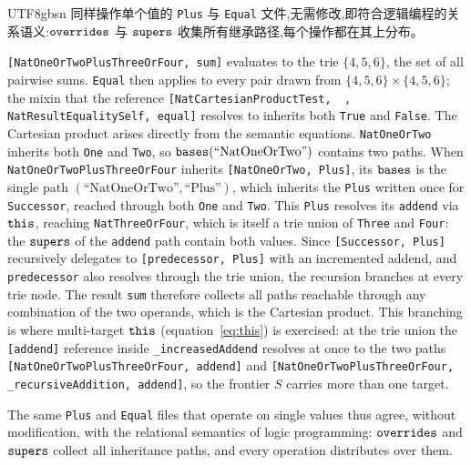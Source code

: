 \begin{CJK*}{UTF8}{gbsn}
同样操作单个值的 \texttt{Plus} 与 \texttt{Equal} 文件,无需修改,即符合逻辑编程的关系语义:$\mathtt{overrides}$ 与 $\mathtt{supers}$ 收集所有继承路径,每个操作都在其上分布。
\else
\begin{sloppypar}
\texttt{[NatOneOrTwoPlusThreeOrFour, sum]} evaluates to the trie $\{4,5,6\}$, the set of all pairwise sums.
\texttt{Equal} then applies to every pair drawn from $\{4,5,6\} \times \{4,5,6\}$;
the mixin that the reference \texttt{[NatCartesianProductTest, ~, NatResultEqualitySelf, equal]} resolves to
inherits both \texttt{True} and \texttt{False}.
The Cartesian product arises directly from the semantic equations.
\texttt{NatOneOrTwo} inherits both \texttt{One} and \texttt{Two},
so $\mathtt{bases}(\text{``NatOneOrTwo''})$ contains two paths.
When \texttt{NatOneOrTwoPlusThreeOrFour} inherits
\texttt{[NatOneOrTwo, Plus]}, its $\mathtt{bases}$ is the single path
$(\text{``NatOneOrTwo''}, \text{``Plus''})$, which inherits the \texttt{Plus} written once
for \texttt{Successor}, reached through both \texttt{One} and
\texttt{Two}.
This \texttt{Plus} resolves its \texttt{addend} via
$\mathtt{this}$, reaching \texttt{NatThreeOrFour}, which is itself a
trie union of \texttt{Three} and \texttt{Four}:
the $\mathtt{supers}$ of the \texttt{addend} path contain both values.
Since \texttt{[Successor, Plus]} recursively delegates to
\texttt{[predecessor, Plus]} with an incremented addend,
and \texttt{predecessor} also resolves through the trie union,
the recursion branches at every trie node.
The result \texttt{sum} therefore collects all paths reachable
through any combination of the two operands, which is the
Cartesian product.
This branching is where multi-target $\mathtt{this}$
(equation~\ref{eq:this}) is exercised: at the trie union the
\texttt{[addend]} reference inside
\texttt{_increasedAddend} resolves at once to the two paths
\texttt{[NatOneOrTwoPlusThreeOrFour, addend]} and
\texttt{[NatOneOrTwoPlusThreeOrFour, _recursiveAddition, addend]},
so the frontier $S$ carries more than one target.
\end{sloppypar}

The same \texttt{Plus} and \texttt{Equal} files that operate on
single values thus agree, without modification, with the relational
semantics of logic programming:
$\mathtt{overrides}$ and $\mathtt{supers}$ collect all inheritance paths, and
every operation distributes over them.
\fi


\end{CJK*}
